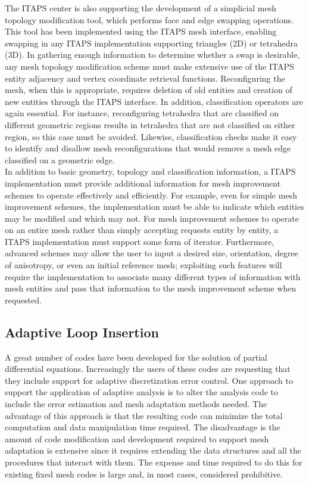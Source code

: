 \documentclass{article}
\begin{document}
The ITAPS center is also supporting the development of a simplicial 
mesh topology modification tool, which performs face and edge 
swapping operations. This tool has been implemented using
the ITAPS mesh interface, enabling swapping in any ITAPS implementation 
supporting triangles (2D) or tetrahedra (3D). In gathering enough 
information to determine whether a swap is desirable, any mesh 
topology modification scheme must make extensive use of the ITAPS 
entity adjacency and vertex coordinate retrieval functions. Reconfiguring 
the mesh, when this is appropriate, requires deletion of old 
entities and creation of new entities through the ITAPS interface. 
In addition, classification operators are again essential. For 
instance, reconfiguring tetrahedra that are classified on different 
geometric regions results in tetrahedra that are not classified 
on either region, so this case must be avoided. Likewise, classification 
checks make it easy to identify and disallow mesh reconfigurations 
that would remove a mesh edge classified on a geometric edge.\\

In addition to basic geometry, topology and classification information, 
a ITAPS implementation must provide additional information for 
mesh improvement schemes to operate effectively and efficiently. 
For example, even for simple mesh improvement schemes, the implementation
must be able to indicate which entities may be modified and which 
may not. For mesh improvement schemes to operate on an entire 
mesh rather than simply accepting requests entity by entity, 
a ITAPS implementation must support some form of iterator. Furthermore, 
advanced schemes may allow the user to input a desired size, 
orientation, degree of anisotropy, or even an initial reference 
mesh; exploiting such features will require the implementation 
to associate many different types of information with mesh entities 
and pass that information to the mesh improvement scheme when 
requested.

\subsection{Adaptive Loop Insertion}

A great number of codes have been developed for the solution 
of partial differential equations. Increasingly the users of 
these codes are requesting that they include support for adaptive 
discretization error control. One approach to support the application 
of adaptive analysis is to alter the analysis code to include the error estimation and mesh 
adaptation methods needed. The advantage of this approach is 
that the resulting code can minimize the total computation and 
data manipulation time required. The disadvantage is the amount of 
code modification and development required to support mesh adaptation 
is extensive since it requires extending the data structures 
and all the procedures that interact with them. The expense and 
time required to do this for existing fixed mesh codes is large 
and, in most cases, considered prohibitive. \\
\end{document}
